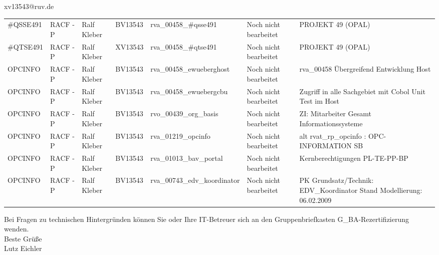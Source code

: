 \documentclass[a4paper,landscape,12pt]{letter}
\begin{document}
\begin{letter}{xv13543@ruv.de\hfill \break}
\begin{tiny}
\begin{longtable}{|p{35mm}|p{15mm}|p{25mm}|p{10mm}|p{40mm}|p{50mm}|p{50mm}|}
\#QSSE491 & RACF - P & Ralf Kleber & BV13543 & rva\_00458\_\#qsse491 & Noch nicht bearbeitet & PROJEKT 49 (OPAL) \\
\#QTSE491 & RACF - P & Ralf Kleber & XV13543 & rva\_00458\_\#qtse491 & Noch nicht bearbeitet & PROJEKT 49 (OPAL) \\
OPCINFO & RACF - P & Ralf Kleber & BV13543 & rva\_00458\_ewueberghost & Noch nicht bearbeitet & rva\_00458 Übergreifend Entwicklung Host \\
OPCINFO & RACF - P & Ralf Kleber & BV13543 & rva\_00458\_ewuebergcbu & Noch nicht bearbeitet & Zugriff in alle Sachgebiet mit Cobol Unit Test im Host \\
OPCINFO & RACF - P & Ralf Kleber & BV13543 & rvo\_00439\_org\_basis & Noch nicht bearbeitet & ZI: Mitarbeiter Gesamt Informationssysteme \\
OPCINFO & RACF - P & Ralf Kleber & BV13543 & rva\_01219\_opcinfo & Noch nicht bearbeitet & alt rvat\_rp\_opcinfo          : OPC- INFORMATION                         SB \\
OPCINFO & RACF - P & Ralf Kleber & BV13543 & rva\_01013\_bav\_portal & Noch nicht bearbeitet & Kernberechtigungen PL-TE-PP-BP \\
OPCINFO & RACF - P & Ralf Kleber & BV13543 & rva\_00743\_edv\_koordinator & Noch nicht bearbeitet & PK Grundsatz/Technik: EDV\_Koordinator Stand Modellierung: 06.02.2009 \\

\hline
		\end{longtable}
		\end{tiny}
	
\begin{minipage}{\textwidth}
			Bei Fragen zu technischen Hintergründen können Sie 
			oder Ihre IT-Betreuer sich an den Gruppenbriefkasten 
			G\_BA-Rezertifizierung
			wenden.\\
			\linebreak
			Beste Grüße\\
			Lutz Eichler
	\end{minipage}
	\end{letter}
	
\end{document}
